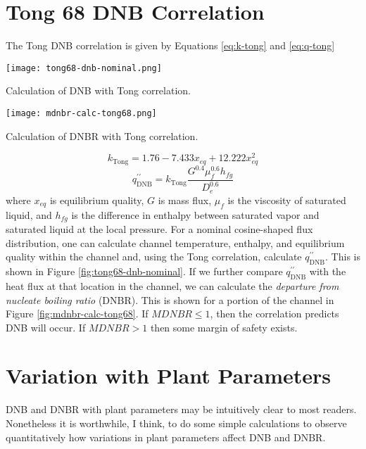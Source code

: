 \section{Tong 68 DNB Correlation} 
The Tong DNB correlation is given by Equations \ref{eq:k-tong} and \ref{eq:q-tong}
\begin{marginfigure}
\texttt{[image: tong68-dnb-nominal.png]}
\caption{Calculation of DNB with Tong correlation.}
\label{fig:tong68-dnb-nominal}
\end{marginfigure}

\begin{marginfigure}
\texttt{[image: mdnbr-calc-tong68.png]}
\caption{Calculation of DNBR with Tong correlation.}
\label{fig:mdnbr-calc-tong68}
\end{marginfigure}

\begin{equation}
k_{\text{Tong}} = 1.76 - 7.433 x_{eq} + 12.222x_{eq}^2
\label{eq:k-tong}
\end{equation}
\begin{equation}
q^{\prime \prime}_{\text{DNB}} = k_{\text{Tong}} \frac{G^{0.4}\mu_f^{0.6}h_{fg}}{D_{e}^{0.6}}
\label{eq:q-tong}
\end{equation}
where $x_{eq}$ is equilibrium quality, $G$ is mass flux, $\mu_{f}$ is the viscosity of saturated liquid, and $h_{fg}$ is the difference in enthalpy between saturated vapor and saturated liquid at the local pressure.  For a nominal cosine-shaped flux distribution, one can calculate channel temperature, enthalpy, and equilibrium quality within the channel and, using the Tong correlation, calculate $q^{\prime \prime}_{\text{DNB}}$.  This is shown in Figure \ref{fig:tong68-dnb-nominal}. If we further compare $q^{\prime \prime}_{\text{DNB}}$ with the heat flux at that location in the channel, we can calculate the \emph{departure from nucleate boiling ratio} (DNBR).  This is shown for a portion of the channel in Figure \ref{fig:mdnbr-calc-tong68}.  If $MDNBR \le 1$, then the correlation predicts DNB will occur.  If $MDNBR > 1$ then some margin of safety exists.

\section{Variation with Plant Parameters}
 DNB and DNBR with plant parameters may be intuitively clear to most readers.  Nonetheless it is worthwhile, I think, to do some simple calculations to observe quantitatively how variations in plant parameters affect DNB and DNBR.

